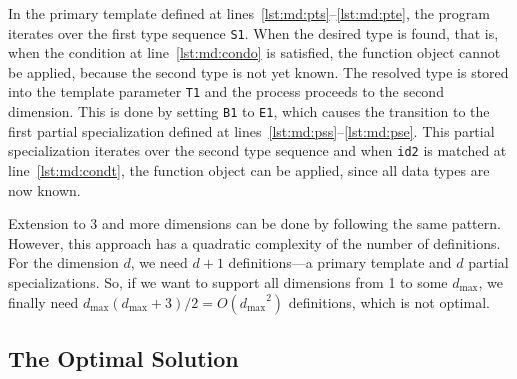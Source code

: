 \documentclass[10pt,a4paper]{article}
\theoremstyle{definition}\newtheorem{problem}{Problem}
\providecommand{\symdim}{\ensuremath{d}\xspace}
\providecommand{\symdimmax}{\ensuremath{d_{\max}}\xspace}
\begin{document}
\noindent
In the primary template defined at lines~\ref{lst:md:pts}--\ref{lst:md:pte}, the program iterates over the first type sequence \texttt{S1}. When the desired type is found, that is, when the condition at line~\ref{lst:md:condo} is satisfied, the function object cannot be applied, because the second type is not yet known. The resolved type is stored into the template parameter \texttt{T1} and the process proceeds to the second dimension. This is done by setting \texttt{B1} to \texttt{E1}, which causes the transition to the first partial specialization defined at lines~\ref{lst:md:pss}--\ref{lst:md:pse}. This partial specialization iterates over the second type sequence and when \verb|id2| is matched at line~\ref{lst:md:condt}, the function object can be applied, since all data types are now known.

Extension to 3 and more dimensions can be done by following the same pattern. However, this approach has a quadratic complexity of the number of definitions. For the dimension \symdim, we need $\symdim+1$ definitions---a primary template and \symdim partial specializations. So, if we want to support all dimensions from 1 to some \symdimmax, we finally need $\symdimmax(\symdimmax+3)/2=O(\symdimmax^2)$ definitions, which is not optimal.




\subsection{The Optimal Solution}
\end{document}
